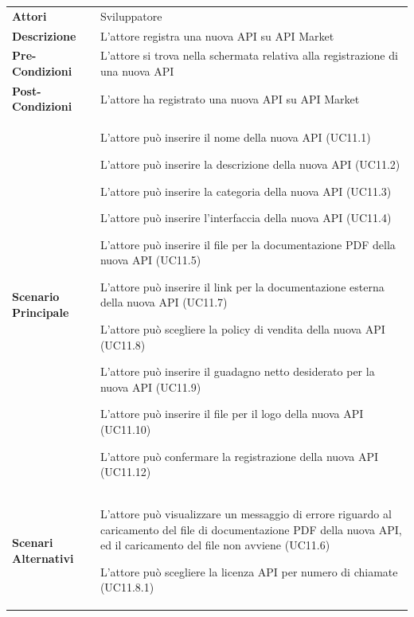 \begin{longtable}{ l | p{11cm}}
	\hline
	\rowcolor{Gray}
	\multicolumn{2}{c}{UC11 - Registrazione nuova API}\\
	\hline
	\textbf{Attori} & Sviluppatore \\
	\textbf{Descrizione} & L'attore registra una nuova API su API Market \\
	\textbf{Pre-Condizioni} & L'attore si trova nella schermata relativa alla registrazione di una nuova API \\
	\textbf{Post-Condizioni} & L'attore ha registrato una nuova API su API Market \\
	\textbf{Scenario Principale} & 
	\begin{enumerate*}[label=(\arabic*.),itemjoin={\newline}]
		\item L'attore può inserire il nome della nuova API (UC11.1)
		\item L'attore può inserire la descrizione della nuova API (UC11.2)
		\item L'attore può inserire la categoria della nuova API (UC11.3)
		\item L'attore può inserire l'interfaccia della nuova API (UC11.4)
		\item L'attore può inserire il file per la documentazione PDF della nuova API (UC11.5)
		\item L'attore può inserire il link per la documentazione esterna della nuova API (UC11.7)
		\item L'attore può scegliere la policy di vendita della nuova API (UC11.8)
		\item L'attore può inserire il guadagno netto desiderato per la nuova API (UC11.9)
		\item L'attore può inserire il file per il logo della nuova API (UC11.10)
		\item L'attore può confermare la registrazione della nuova API (UC11.12)
	\end{enumerate*}\\
	\textbf{Scenari Alternativi} & 
	\begin{enumerate*}[label=(\arabic*.),itemjoin={\newline}]
			\item L'attore può visualizzare un messaggio di errore riguardo al caricamento del file di documentazione PDF della nuova API, ed il caricamento del file non avviene (UC11.6)
			\item L'attore può scegliere la licenza API per numero di chiamate (UC11.8.1)

\end{enumerate*}
\end{longtable}
